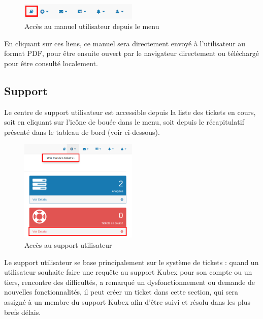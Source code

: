 \documentclass[a4paper]{report}
\begin{document}
\begin{figure}[h!]
	\centering
	\includegraphics[width=0.5\textwidth]{images/menuManual.png}
	\caption{\label{fig:manual} Accès au manuel utilisateur depuis le menu}
\end{figure}

En cliquant sur ces liens, ce manuel sera directement envoyé à l'utilisateur au format PDF, pour être ensuite ouvert par le navigateur directement ou téléchargé pour être consulté localement.

\subsection{Support}
\label{subsec:support}

Le centre de support utilisateur est accessible depuis la liste des tickets en cours, soit en cliquant sur l'icône de bouée dans le menu, soit depuis le récapitulatif présenté dans le tableau de bord (voir ci-dessous).

\begin{figure}[h!]
	\centering
	\includegraphics[width=0.5\textwidth]{images/accesSupport.png}
	\caption{\label{fig:accSupport} Accès au support utilisateur}
\end{figure}

Le support utilisateur se base principalement sur le système de tickets : quand un utilisateur souhaite faire une requête au support Kubex pour son compte ou un tiers, rencontre des difficultés, a remarqué un dysfonctionnement ou demande de nouvelles fonctionnalités, il peut créer un ticket dans cette section, qui sera assigné à un membre du support Kubex afin d'être suivi et résolu dans les plus brefs délais.\\
\end{document}

